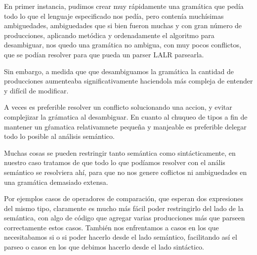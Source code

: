 En primer instancia, pudimos crear muy rápidamente una gramática que pedía todo lo que el lenguaje especificado nos pedía, 
pero contenía muchísimas ambiguedades, ambiguedades que si bien fueron muchas y con gran número de producciones, aplicando
metódica y ordenadamente el algoritmo para desambiguar, nos quedo una gramática no ambigua, con muy pocos conflictos, que 
se podían resolver para que pueda un parser LALR parsearla.

Sin embargo, a medida que que desambiguamos la gramática la cantidad de producciones aumenteaba significativamente haciendola más 
compleja de entender y difícil de modificar.

A veces es preferible resolver un conflicto solucionando una accion, y evitar complejizar la grámatica al desambiguar.
En cuanto al chuqueo de tipos a fin de mantener un gŕamatica relativamnete pequeña y manjeable es preferible delegar 
todo lo posible al análisis semántico. 

Muchas cosas se pueden restringir tanto semántica como sintácticamente, en nuestro caso tratamos de que todo lo que podíamos
resolver con el anális semántico se resolviera ahí, para que no nos genere coflictos ni ambiguedades en una gramática demasiado
extensa. 

Por ejemplos casos de operadores de comparación, que esperan dos expresiones del mismo tipo, claramente es mucho más fácil poder
restringirlo del lado de la semántica, con algo de código que agregar varias producciones más que parseen correctamente estos casos.
También nos enfrentamos a casos en los que necesitabamos si o si poder hacerlo desde el lado semántico, facilitando así el parseo
o casos en los que debimos hacerlo desde el lado sintáctico. 


     

